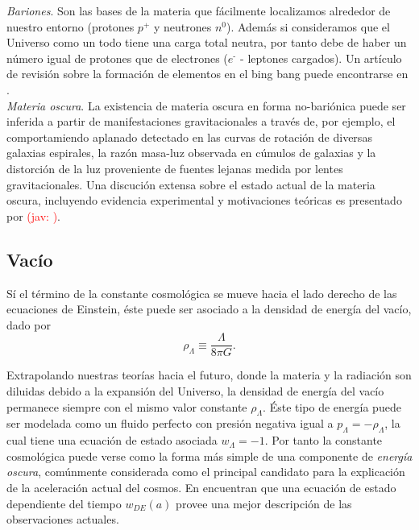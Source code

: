 \documentclass[10.5pt,prb,
               showpacs,            %
               preprintnumbers,     %
               aps,                 %
               prl,          	    %
               letterpaper,             %
               superscriptaddress,      %
               nofootinbib,         %
               tightenlines,        %
               floats,floatfix      %
               ,usenatbib]{revtex4-1}%
\def\beq{\begin{equation}}
\def\eeq{\end{equation}}
\newcommand{\jav}[1]{\textcolor{red}{(jav: #1)}}
\begin{document}
\textit{Bariones}. Son las bases de la materia que f\'acilmente localizamos alrededor de nuestro entorno 
(protones $p^\texttt{+}$ y neutrones $n^0$).
Adem\'as si consideramos que el Universo como un todo tiene una carga total neutra, por tanto debe de haber 
un n\'umero igual de protones que de electrones ($e^\texttt{-}$ - leptones cargados). 
Un art\'iculo de revisi\'on sobre la formaci\'on de elementos en el bing bang puede encontrarse en \cite{bbn}.
\\



\textit{Materia oscura}. La existencia de materia oscura en forma no-bari\'onica puede ser inferida a 
partir de manifestaciones gravitacionales a trav\'es de, por ejemplo, el comportamiendo 
aplanado detectado en las curvas de rotaci\'on de diversas galaxias espirales, la
raz\'on masa-luz observada en c\'umulos de galaxias y la distorci\'on de la luz proveniente 
de fuentes lejanas medida por lentes gravitacionales.
 Una discuci\'on extensa sobre el estado actual de la materia oscura, incluyendo evidencia experimental
y motivaciones te\'oricas es presentado por \jav{\cite{}}.


\subsection*{Vac\'io} 


S\'i el t\'ermino de la constante cosmol\'ogica se mueve hacia el lado derecho de las ecuaciones de Einstein, 
\'este puede ser asociado a la densidad de energ\'ia del vac\'io, dado por 
%
	\beq
		\rho_\Lambda \equiv \frac{\Lambda}{8\pi G}.
	\eeq

\noindent
Extrapolando nuestras teor\'ias hacia el futuro, donde la materia y la radiaci\'on son diluidas debido a la expansi\'on del Universo, 
la densidad de energ\'ia del vac\'io permanece siempre con el mismo valor constante $\rho_\Lambda$.
\'Este tipo de energ\'ia  puede ser modelada como un fluido perfecto con presi\'on negativa igual a $p_\Lambda =-\rho_\Lambda$,
la cual tiene una ecuaci\'on de estado asociada $w_\Lambda=-1$. 
Por tanto la constante cosmol\'ogica puede verse como la forma m\'as simple de una componente de \textit{energ\'ia oscura}, 
com\'unmente considerada como el principal candidato para la explicaci\'on de la aceleraci\'on actual del cosmos.
En \cite{darken} encuentran que una ecuaci\'on de estado dependiente del tiempo $w_{DE}(a)$ provee una mejor descripci\'on de las
observaciones actuales. 
\end{document}
